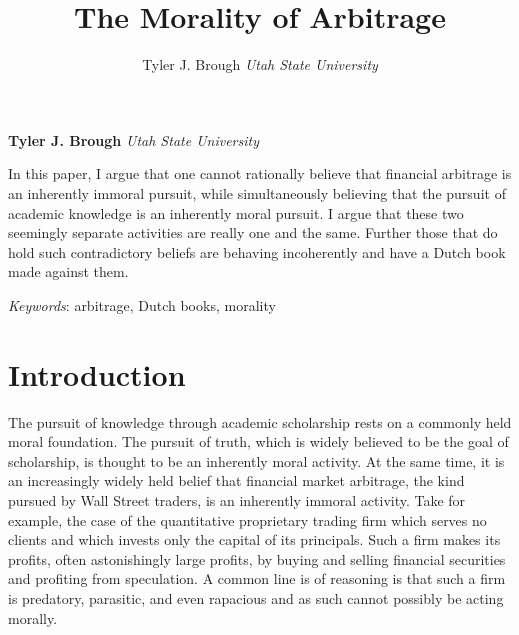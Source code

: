 \documentclass[11pt,]{article}
\title{The Morality of Arbitrage  }
\author{\Large Tyler J. Brough\vspace{0.05in} \newline\normalsize\emph{Utah State University}  }
\date{}
\newcommand*{\authorfont}{\fontfamily{phv}\selectfont}
\renewenvironment{abstract}
 {{%
    \setlength{\leftmargin}{0mm}
    \setlength{\rightmargin}{\leftmargin}%
  }%
  \relax}
 {\endlist}
\begin{document}
	
%

{%
\setlength{\parindent}{0pt}
\thispagestyle{plain}
{\fontsize{18}{20}\selectfont\raggedright 
\maketitle  %

}

{
   \vskip 13.5pt\relax \normalsize\fontsize{11}{12} 
\textbf{\authorfont Tyler J. Brough} \hskip 15pt \emph{\small Utah State University}   

}

}







\begin{abstract}

    \hbox{\vrule height .2pt width 39.14pc}

    \vskip 8.5pt %

\noindent In this paper, I argue that one cannot rationally believe that financial
arbitrage is an inherently immoral pursuit, while simultaneously
believing that the pursuit of academic knowledge is an inherently moral
pursuit. I argue that these two seemingly separate activities are really
one and the same. Further those that do hold such contradictory beliefs
are behaving incoherently and have a Dutch book made against them.


\vskip 8.5pt \noindent \emph{Keywords}: arbitrage, Dutch books, morality \par

    \hbox{\vrule height .2pt width 39.14pc}



\end{abstract}


\vskip 6.5pt

\noindent  \section{Introduction}\label{introduction}

The pursuit of knowledge through academic scholarship rests on a
commonly held moral foundation. The pursuit of truth, which is widely
believed to be the goal of scholarship, is thought to be an inherently
moral activity. At the same time, it is an increasingly widely held
belief that financial market arbitrage, the kind pursued by Wall Street
traders, is an inherently immoral activity. Take for example, the case
of the quantitative proprietary trading firm which serves no clients and
which invests only the capital of its principals. Such a firm makes its
profits, often astonishingly large profits, by buying and selling
financial securities and profiting from speculation. A common line is of
reasoning is that such a firm is predatory, parasitic, and even
rapacious and as such cannot possibly be acting morally.
\end{document}
